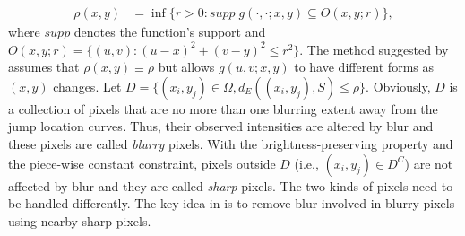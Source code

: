 \begin{align*}
  \rho(x,y) &=\inf\{r>0: supp\; g(\cdot, \cdot; x,y) \subseteq O(x,y; r) \}, 
\end{align*}
where \(supp\) denotes the function's support and \(O(x,y;r) = \{(u,v): (u-x)^2+(v-y)^2 \leq r^2 \}\). The method suggested by \citet{kang2020consistent} assumes that \(\rho(x,y) \equiv \rho\) but allows \(g(u,v;x,y)\) to have different forms as \((x,y)\) changes. Let \(D=\{(x_i, y_j)\in \Omega, d_E((x_i,y_j), S)\leq \rho  \}\). Obviously, \(D\) is a collection of pixels that are no more than one blurring extent away from the jump location curves. Thus, their observed intensities are altered by blur and these pixels are called \emph{blurry} pixels. With the brightness-preserving property and the piece-wise constant constraint, pixels outside \(D\) (i.e., \((x_i, y_j)\in D^C\)) are not affected by blur and they are called \emph{sharp} pixels. The two kinds of pixels need to be handled differently. The key idea in \citet{kang2020consistent} is to remove blur involved in blurry pixels using nearby sharp pixels.

